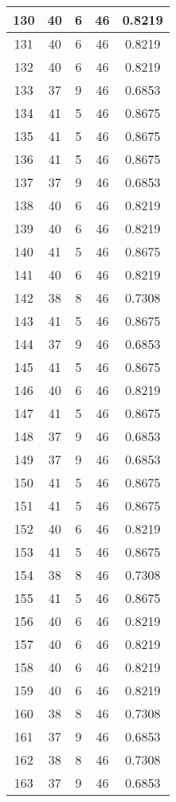 \documentclass[letterpaper, 12pt]{article}
\begin{document}
\begin{longtable}{|c|c|c|c|c|}
\hline
130 & 40 & 6 & 46 & 0.8219 \\
\hline
131 & 40 & 6 & 46 & 0.8219 \\
\hline
132 & 40 & 6 & 46 & 0.8219 \\
\hline
133 & 37 & 9 & 46 & 0.6853 \\
\hline
134 & 41 & 5 & 46 & 0.8675 \\
\hline
135 & 41 & 5 & 46 & 0.8675 \\
\hline
136 & 41 & 5 & 46 & 0.8675 \\
\hline
137 & 37 & 9 & 46 & 0.6853 \\
\hline
138 & 40 & 6 & 46 & 0.8219 \\
\hline
139 & 40 & 6 & 46 & 0.8219 \\
\hline
140 & 41 & 5 & 46 & 0.8675 \\
\hline
141 & 40 & 6 & 46 & 0.8219 \\
\hline
142 & 38 & 8 & 46 & 0.7308 \\
\hline
143 & 41 & 5 & 46 & 0.8675 \\
\hline
144 & 37 & 9 & 46 & 0.6853 \\
\hline
145 & 41 & 5 & 46 & 0.8675 \\
\hline
146 & 40 & 6 & 46 & 0.8219 \\
\hline
147 & 41 & 5 & 46 & 0.8675 \\
\hline
148 & 37 & 9 & 46 & 0.6853 \\
\hline
149 & 37 & 9 & 46 & 0.6853 \\
\hline
150 & 41 & 5 & 46 & 0.8675 \\
\hline
151 & 41 & 5 & 46 & 0.8675 \\
\hline
152 & 40 & 6 & 46 & 0.8219 \\
\hline
153 & 41 & 5 & 46 & 0.8675 \\
\hline
154 & 38 & 8 & 46 & 0.7308 \\
\hline
155 & 41 & 5 & 46 & 0.8675 \\
\hline
156 & 40 & 6 & 46 & 0.8219 \\
\hline
157 & 40 & 6 & 46 & 0.8219 \\
\hline
158 & 40 & 6 & 46 & 0.8219 \\
\hline
159 & 40 & 6 & 46 & 0.8219 \\
\hline
160 & 38 & 8 & 46 & 0.7308 \\
\hline
161 & 37 & 9 & 46 & 0.6853 \\
\hline
162 & 38 & 8 & 46 & 0.7308 \\
\hline
163 & 37 & 9 & 46 & 0.6853 \\

\end{longtable}
\end{document}
